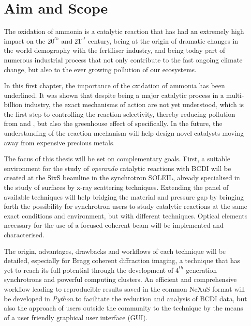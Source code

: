 \section{Aim and Scope}

The oxidation of ammonia is a catalytic reaction that has had an extremely high impact on the $20^{th}$ and $21^{st}$ century, being at the origin of dramatic changes in the world demography with the fertiliser industry, and being today part of numerous industrial process that not only contribute to the fast ongoing climate change, but also to the ever growing pollution of our ecosystems.

In this first chapter, the importance of the oxidation of ammonia has been underlined.
It was shown that despite being a major catalytic process in a multi-billion industry, the exact mechanisms of action are not yet understood, which is the first step to controlling the reaction selectivity, thereby reducing pollution from  and , but also the greenhouse effect of  specifically.
In the future, the understanding of the reaction mechanism will help design novel catalysts moving away from expensive precious metals.

The focus of this thesis will be set on complementary goals.
First, a suitable environment for the study of \textit{operando} catalytic reactions with BCDI will be created at the SixS beamline in the synchrotron SOLEIL, already specialised in the study of surfaces by x-ray scattering techniques.
Extending the panel of available techniques will help bridging the material and pressure gap by bringing forth the possibility for synchrotron users to study catalytic reactions at the same exact conditions and environment, but with different techniques.
Optical elements necessary for the use of a focused coherent beam will be implemented and characterised.

The origin, advantages, drawbacks and workflows of each technique will be detailed, especially for Bragg coherent diffraction imaging, a technique that has yet to reach its full potential through the development of $4^{th}$-generation synchrotrons and powerful computing clusters.
An efficient and comprehensive workflow leading to reproducible results saved in the common NeXuS format \parencite{Konnecke2015} will be developed in \textit{Python} to facilitate the reduction and analysis of BCDI data, but also the approach of users outside the community to the technique by the means of a user friendly graphical user interface (GUI).

